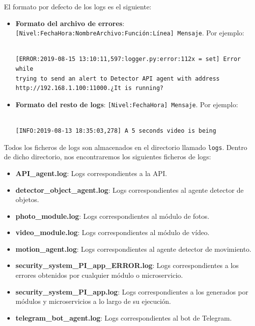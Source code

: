 El formato por defecto de los logs es el siguiente:

\begin{itemize}
\item \textbf{Formato del archivo de errores}: \texttt{[Nivel:FechaHora:NombreArchivo:Función:Línea] Mensaje}. Por ejemplo:

\vspace{-1cm}

\begin{verbatim}

[ERROR:2019-08-15 13:10:11,597:logger.py:error:112x = set] Error while
trying to send an alert to Detector API agent with address 
http://192.168.1.100:11000.¿It is running?

\end{verbatim}


\vspace{-1cm}

\item \textbf{Formato del resto de logs}: \texttt{[Nivel:FechaHora] Mensaje}. Por ejemplo:

\vspace{-1.2cm}

\begin{verbatim}

[INFO:2019-08-13 18:35:03,278] A 5 seconds video is being 

\end{verbatim}

\end{itemize}

\vspace{-1.2cm}

Todos los ficheros de logs son almacenados en el directorio llamado \texttt{logs}. Dentro de dicho directorio, nos encontraremos los siguientes ficheros de logs:

\vspace{-0.4cm}

\begin{itemize}
\item \textbf{API\_agent.log}: Logs correspondientes a la API.
\item \textbf{detector\_object\_agent.log}: Logs correspondientes al agente detector de objetos.
\item \textbf{photo\_module.log}: Logs correspondientes al módulo de fotos.
\item \textbf{video\_module.log}: Logs correspondientes al módulo de vídeo.
\item \textbf{motion\_agent.log}: Logs correspondientes al agente detector de movimiento.
\item \textbf{security\_system\_PI\_app\_ERROR.log}: Logs correspondientes a los errores obtenidos por cualquier módulo o microservicio.
\item \textbf{security\_system\_PI\_app.log}: Logs correspondientes a los generados por módulos y microservicios a lo largo de su ejecución.
\item \textbf{telegram\_bot\_agent.log}: Logs correspondientes al bot de Telegram.

\end{itemize}

